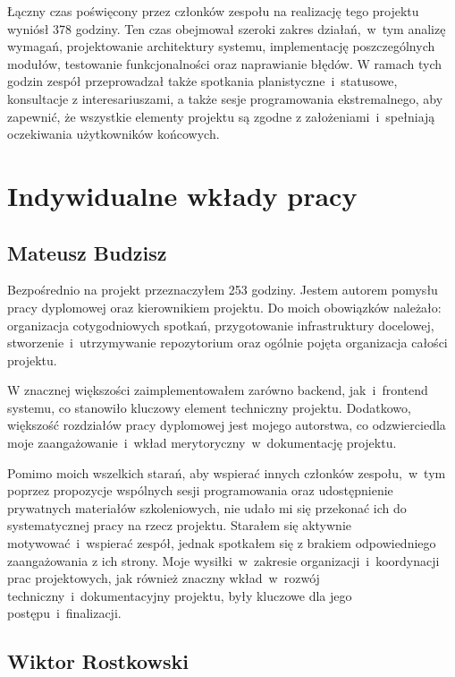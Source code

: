 Łączny czas poświęcony przez członków zespołu na realizację tego projektu wyniósł 378 godziny.
Ten czas obejmował szeroki zakres działań,~w~tym analizę wymagań, projektowanie architektury systemu, implementację poszczególnych modułów, testowanie funkcjonalności oraz naprawianie błędów.
W ramach tych godzin zespół przeprowadzał także spotkania planistyczne~i~statusowe, konsultacje z interesariuszami, a także sesje programowania ekstremalnego, aby zapewnić, że wszystkie elementy projektu są zgodne z założeniami~i~spełniają oczekiwania użytkowników końcowych.

\section{Indywidualne wkłady pracy}
\label{sec:indywidualne-wklady-pracy}

\subsection{Mateusz Budzisz}
\label{subsec:mateusz-budzisz}

Bezpośrednio na projekt przeznaczyłem 253 godziny.
Jestem autorem pomysłu pracy dyplomowej oraz kierownikiem projektu.
Do moich obowiązków należało: organizacja cotygodniowych spotkań, przygotowanie infrastruktury docelowej, stworzenie~i~utrzymywanie repozytorium oraz ogólnie pojęta organizacja całości projektu.

W znacznej większości zaimplementowałem zarówno backend, jak~i~frontend systemu, co stanowiło kluczowy element techniczny projektu.
Dodatkowo, większość rozdziałów pracy dyplomowej jest mojego autorstwa, co odzwierciedla moje zaangażowanie~i~wkład merytoryczny~w~dokumentację projektu.

Pomimo moich wszelkich starań, aby wspierać innych członków zespołu,~w~tym poprzez propozycje wspólnych sesji programowania oraz udostępnienie prywatnych materiałów szkoleniowych, nie udało mi się przekonać ich do systematycznej pracy na rzecz projektu.
Starałem się aktywnie motywować~i~wspierać zespół, jednak spotkałem się z brakiem odpowiedniego zaangażowania z ich strony.
Moje wysiłki~w~zakresie organizacji~i~koordynacji prac projektowych, jak również znaczny wkład~w~rozwój techniczny~i~dokumentacyjny projektu, były kluczowe dla jego postępu~i~finalizacji.

\subsection{Wiktor Rostkowski}
\label{subsec:wiktor-rostkowski}


